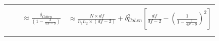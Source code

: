 \documentclass[
  man,floatsintext]{apa6}
\begin{document}
\begin{landscape}
\begin{longtable}[]{@{}lccc@{}}
\begin{minipage}[t]{0.12\columnwidth}
\end{minipage} & \begin{minipage}[t]{0.11\columnwidth}\centering
\strut
\end{minipage} & \begin{minipage}[t]{0.24\columnwidth}\centering
\strut
\end{minipage} & \begin{minipage}[t]{0.42\columnwidth}\centering
\strut
\end{minipage}\tabularnewline
\begin{minipage}[t]{0.12\columnwidth}\raggedright
\strut
\end{minipage} & \begin{minipage}[t]{0.11\columnwidth}\centering
\strut
\end{minipage} & \begin{minipage}[t]{0.24\columnwidth}\centering
\(\approx \frac{\delta_{Cohen}}{\left(1-\frac{3}{4N-9}\right)}\)\strut
\end{minipage} & \begin{minipage}[t]{0.42\columnwidth}\centering
\(\approx \frac{N\times df}{n_1n_2 \times (df-2)} + \delta^2_{Cohen} \left[ \frac{df}{df-2} - \left( \frac{1}{1-\frac{3}{4N-9} }\right)^2\right]\)\strut
\end{minipage}\tabularnewline
\begin{minipage}[t]{0.12\columnwidth}\raggedright
\strut
\end{minipage} & \begin{minipage}[t]{0.11\columnwidth}\centering
\strut
\end{minipage} & \begin{minipage}[t]{0.24\columnwidth}\centering
\strut
\end{minipage} & \begin{minipage}[t]{0.42\columnwidth}\centering
\strut
\end{minipage}\tabularnewline
\begin{minipage}[t]{0.12\columnwidth}\raggedright
\strut
\end{minipage} & \begin{minipage}[t]{0.11\columnwidth}\centering
\strut
\end{minipage} & \begin{minipage}[t]{0.24\columnwidth}\centering
\strut
\end{minipage} & \begin{minipage}[t]{0.42\columnwidth}\centering
\strut
\end{minipage}\tabularnewline

\end{longtable}
\end{landscape}
\end{document}

